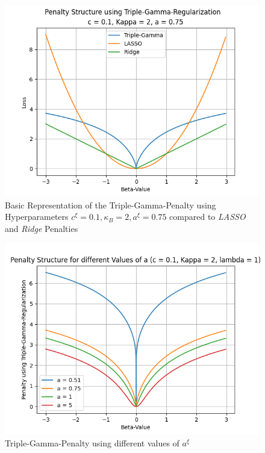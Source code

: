 \documentclass[12pt,a4paper]{article}
\begin{document}
\begin{figure}[!h]
\centering
\includegraphics[scale=0.75]{../02_simulation/021_simulation_figures/simpleTGpenalty.png}
\caption{Basic Representation of the Triple-Gamma-Penalty using Hyperparameters $c^\xi = 0.1, \kappa_B = 2, a^\xi = 0.75$ compared to \textit{LASSO} and \textit{Ridge} Penalties}
\label{fig:basicTGPen}
\end{figure}

\begin{figure}[!h]
\centering
\includegraphics[scale=0.75]{../02_simulation/021_simulation_figures/TGPenalty_ChangeInA.png}
\caption{Triple-Gamma-Penalty using different values of $a^\xi$}
\label{fig:basicTGPen}
\end{figure}
\end{document}
